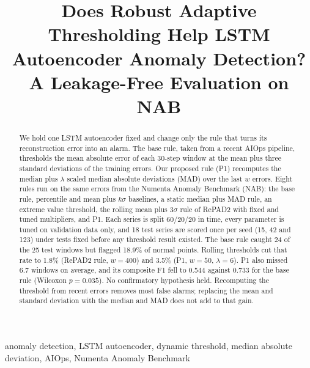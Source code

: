 \documentclass[conference]{IEEEtran}
\begin{document}
\title{Does Robust Adaptive Thresholding Help LSTM Autoencoder Anomaly Detection? A Leakage-Free Evaluation on NAB}

\author{
}

\maketitle

\begin{abstract}
We hold one LSTM autoencoder fixed and change only the rule that turns its reconstruction error into an alarm. The base rule, taken from a recent AIOps pipeline, thresholds the mean absolute error of each 30-step window at the mean plus three standard deviations of the training errors. Our proposed rule (P1) recomputes the median plus $\lambda$ scaled median absolute deviations (MAD) over the last $w$ errors. Eight rules run on the same errors from the Numenta Anomaly Benchmark (NAB): the base rule, percentile and mean plus $k\sigma$ baselines, a static median plus MAD rule, an extreme value threshold, the rolling mean plus $3\sigma$ rule of RePAD2 with fixed and tuned multipliers, and P1. Each series is split 60/20/20 in time, every parameter is tuned on validation data only, and 18 test series are scored once per seed (15, 42 and 123) under tests fixed before any threshold result existed. The base rule caught 24 of the 25 test windows but flagged 18.9\% of normal points. Rolling thresholds cut that rate to 1.8\% (RePAD2 rule, $w = 400$) and 3.5\% (P1, $w = 50$, $\lambda = 6$). P1 also missed 6.7 windows on average, and its composite F1 fell to 0.544 against 0.733 for the base rule (Wilcoxon $p = 0.035$). No confirmatory hypothesis held. Recomputing the threshold from recent errors removes most false alarms; replacing the mean and standard deviation with the median and MAD does not add to that gain.
\end{abstract}

\begin{IEEEkeywords}
anomaly detection, LSTM autoencoder, dynamic threshold, median absolute deviation, AIOps, Numenta Anomaly Benchmark
\end{IEEEkeywords}
\end{document}

